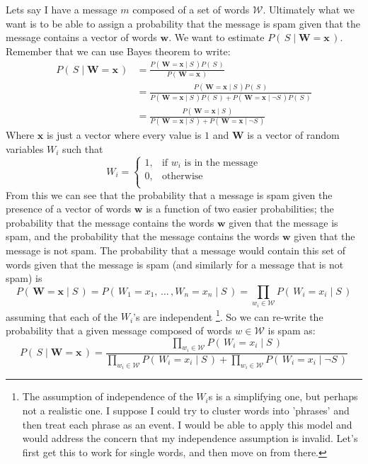 \documentclass[11pt, oneside]{article}   	%
\newcommand{\ffrac}[2]{\ensuremath{\frac{\displaystyle #1}{\displaystyle #2}}}
\begin{document}
Lets say I have a message $m$ composed of a set of words \(\mathcal{W}\). Ultimately what we want is to be able to assign a probability that the message is spam given that the message contains a vector of words $\bm{w}$. We want to estimate $P(\,S \mid \bm{W} = \bm{x}\,)$. Remember that we can use Bayes theorem to write:
\begin{align*}
P(\,S\mid \bm{W}=\bm{x}\,) &= \frac 
	{P(\,\bm{W}=\bm{x} \mid S\,)P(\,S\,)} 
	{P(\,\bm{W}=\bm{x}\,)} \\
	&= \frac
	{P(\,\bm{W}=\bm{x} \mid S\,)P(\,S\,)} 
	{P(\,\bm{W}=\bm{x} \mid S\,)P(\,S\,) + P(\,\bm{W}=\bm{x} \mid \neg S\,)P(\,S\,)}  \\
	&= \frac
	{P(\,\bm{W}=\bm{x} \mid S\,)} 
	{P(\,\bm{W}=\bm{x} \mid S\,) + P(\,\bm{W}=\bm{x} \mid \neg S\,)}
\end{align*}
Where $\bm{x}$ is just a vector where every value is $1$ and $\bm{W}$ is a vector of random variables $W_i$ such that
\[
W_i= \begin{cases}
1, & \text{if } w_i \text{ is in the message} \\
0,  & \text{otherwise} \\
\end{cases}
\]
From this we can see that the probability that a message is spam given the presence of a vector of words $\bm{w}$ is a function of two easier probabilities; the probability that the message contains the words $\bm{w}$ given that the message is spam, and the probability that the message contains the words $\bm{w}$ given that the message is not spam. The probability that a message would contain this set of words given that the message is spam (and similarly for a message that is not spam) is \[P(\,\bm{W}=\bm{x} \mid S \,) = P(\,W_1 = x_1,\, \ldots \,, W_n = x_n \mid S \,) = \prod_{w_i \in \mathcal{W}}P(\,W_i=x_i\mid S\,)\] assuming that each of the \(W_i\)'s are independent \footnote{The assumption of independence of the \(W_i \)s is a simplifying one, but perhaps not a realistic one. I suppose I could try to cluster words into 'phrases' and then treat each phrase as an event. I would be able to apply this model and would address the concern that my independence assumption is invalid. Let's first get this to work for single words, and then move on from there.}. So we can re-write the probability that a given message composed of words $w \in \mathcal{W}$ is spam as:
\begin{equation}
P(\,S\mid \bm{W}=\bm{x}\,) = \ffrac
	{ \prod_{w_i \in \mathcal{W}} P(\,W_i=x_i \mid S\,)}
	{ \prod_{w_i \in \mathcal{W}} P(\,W_i=x_i \mid S\,) + \prod_{w_i \in \mathcal{W}} P(\,W_i=x_i \mid \neg S\,)}
\end{equation}
\end{document}
